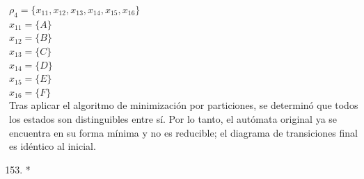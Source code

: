 \documentclass[12pt]{article}
\begin{document}
\begin{center}
\begin{minipage}{0.45\textwidth}
\begin{center}
\begin{tabular}{c|ccc l}
                \end{tabular}
                \end{center} 
                 $\rho_4=\{x_{11}, x_{12}, x_{13}, x_{14}, x_{15}, x_{16}\}$\\
                $x_{11}=\{A\}$\\
                $x_{12}=\{B\}$\\
                $x_{13}=\{C\}$\\
                $x_{14}=\{D\}$\\
                $x_{15}=\{E\}$\\
		$x_{16}=\{F\}$\\

		Tras aplicar el algoritmo de minimización por particiones, se determinó que todos los estados son distinguibles entre sí. Por lo tanto, el autómata original ya se encuentra en su forma mínima y no es reducible; el diagrama de transiciones final es idéntico al inicial.
		\end{minipage}
                \end{center}
\begin{enumerate}		
\setcounter{enumi}{152}
    \item*
\end{enumerate}
\end{document}
